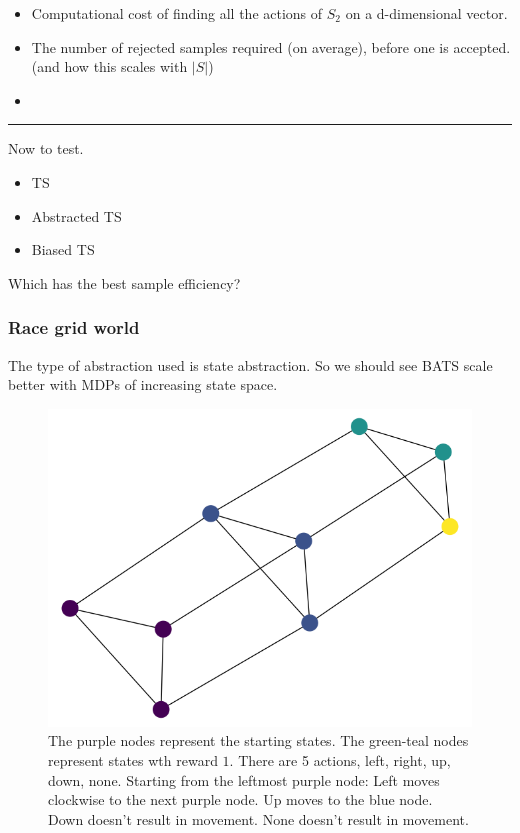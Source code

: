 \begin{itemize}
	\item Computational cost of finding all the actions of $S_2$ on a d-dimensional vector.
	\item The number of rejected samples required (on average), before one is accepted. (and how this scales with $|S|$)
	\item
\end{itemize}


\begin{center}\rule{0.5\linewidth}{\linethickness}\end{center}

Now to test.

\begin{itemize}
	\tightlist
	\item TS
	\item Abstracted TS
	\item Biased TS
\end{itemize}

Which has the best sample efficiency?

\subsubsection{Race grid world}

The type of abstraction used is state abstraction. So we should see BATS scale better with MDPs of increasing state space.

\begin{figure}[h!]
  \centering
  \includegraphics[width=1\textwidth,height=0.5\textheight]{../../pictures/figures/race-mdp-puzzle-n3.png}
  \caption{The purple nodes represent the starting states. The green-teal nodes represent states wth reward $1$. There are 5 actions, left, right, up, down, none.
	Starting from the leftmost purple node: Left moves clockwise to the next purple node. Up moves to the blue node. Down doesn't result in movement. None doesn't result in movement.}
\end{figure}


